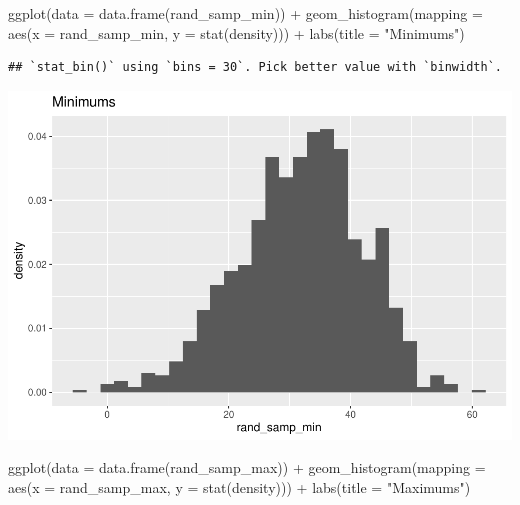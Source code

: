 \documentclass[
]{article}
\newenvironment{Shaded}{\begin{snugshade}}{\end{snugshade}}
\newcommand{\AttributeTok}[1]{\textcolor[rgb]{0.77,0.63,0.00}{#1}}
\newcommand{\FunctionTok}[1]{\textcolor[rgb]{0.00,0.00,0.00}{#1}}
\newcommand{\NormalTok}[1]{#1}
\newcommand{\SpecialCharTok}[1]{\textcolor[rgb]{0.00,0.00,0.00}{#1}}
\newcommand{\StringTok}[1]{\textcolor[rgb]{0.31,0.60,0.02}{#1}}
\begin{document}
\begin{Shaded}
\begin{Highlighting}[]
\FunctionTok{ggplot}\NormalTok{(}\AttributeTok{data =} \FunctionTok{data.frame}\NormalTok{(rand\_samp\_min)) }\SpecialCharTok{+}
  \FunctionTok{geom\_histogram}\NormalTok{(}\AttributeTok{mapping =} \FunctionTok{aes}\NormalTok{(}\AttributeTok{x =}\NormalTok{ rand\_samp\_min, }\AttributeTok{y =} \FunctionTok{stat}\NormalTok{(density))) }\SpecialCharTok{+}
  \FunctionTok{labs}\NormalTok{(}\AttributeTok{title =} \StringTok{"Minimums"}\NormalTok{)}
\end{Highlighting}
\end{Shaded}

\begin{verbatim}
## `stat_bin()` using `bins = 30`. Pick better value with `binwidth`.
\end{verbatim}

\includegraphics{Class_Exercises_ClassNotes_5_files/figure-latex/unnamed-chunk-7-1.pdf}
\newpage

\begin{Shaded}
\begin{Highlighting}[]
\FunctionTok{ggplot}\NormalTok{(}\AttributeTok{data =} \FunctionTok{data.frame}\NormalTok{(rand\_samp\_max)) }\SpecialCharTok{+}
  \FunctionTok{geom\_histogram}\NormalTok{(}\AttributeTok{mapping =} \FunctionTok{aes}\NormalTok{(}\AttributeTok{x =}\NormalTok{ rand\_samp\_max, }\AttributeTok{y =} \FunctionTok{stat}\NormalTok{(density))) }\SpecialCharTok{+}
  \FunctionTok{labs}\NormalTok{(}\AttributeTok{title =} \StringTok{"Maximums"}\NormalTok{)}
\end{Highlighting}
\end{Shaded}
\end{document}

